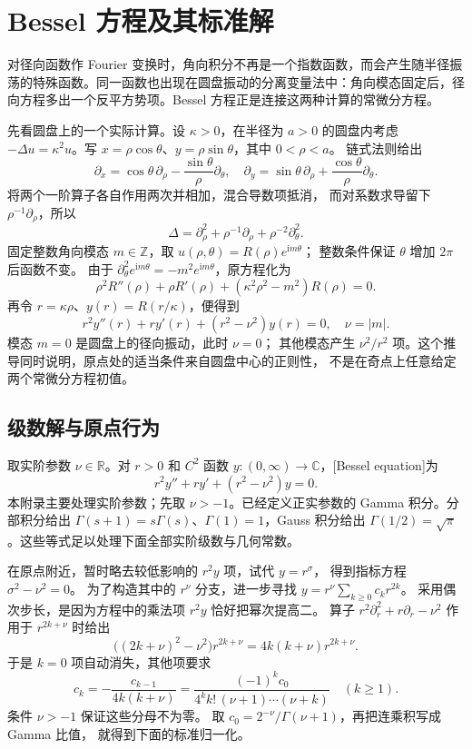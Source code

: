 \section{Bessel 方程及其标准解}
\label{b2:sec:A201}

对径向函数作 Fourier 变换时，角向积分不再是一个指数函数，而会产生随半径振荡的特殊函数。同一函数也出现在圆盘振动的分离变量法中：角向模态固定后，径向方程多出一个反平方势项。Bessel 方程正是连接这两种计算的常微分方程。

\ProseParagraphBreak
先看圆盘上的一个实际计算。设 \(\kappa>0\)，在半径为 \(a>0\) 的圆盘内考虑
\(-\Delta u=\kappa^2u\)。写
\(x=\rho\cos\theta\)、\(y=\rho\sin\theta\)，其中 \(0<\rho<a\)。
链式法则给出
\[
 \partial_x=\cos\theta\,\partial_\rho
 -\frac{\sin\theta}{\rho}\partial_\theta,\quad
 \partial_y=\sin\theta\,\partial_\rho
 +\frac{\cos\theta}{\rho}\partial_\theta.
\]
将两个一阶算子各自作用两次并相加，混合导数项抵消，
而对系数求导留下 \(\rho^{-1}\partial_\rho\)，所以
\[
 \Delta=\partial_\rho^2+\rho^{-1}\partial_\rho
 +\rho^{-2}\partial_\theta^2.
\]
固定整数角向模态 \(m\in\mathbb Z\)，取
\(u(\rho,\theta)=R(\rho)e^{\mathrm im\theta}\)；
整数条件保证 \(\theta\) 增加 \(2\pi\) 后函数不变。
由于 \(\partial_\theta^2e^{\mathrm im\theta}=-m^2e^{\mathrm im\theta}\)，原方程化为
\begin{equation}\label{b2:eq:A2-disk-radial}
 \rho^2R''(\rho)+\rho R'(\rho)
 +(\kappa^2\rho^2-m^2)R(\rho)=0.
\end{equation}
再令 \(r=\kappa\rho\)、\(y(r)=R(r/\kappa)\)，便得到
\[
 r^2y''(r)+ry'(r)+(r^2-\nu^2)y(r)=0,
 \quad \nu=|m|.
\]
模态 \(m=0\) 是圆盘上的径向振动，此时 \(\nu=0\)；
其他模态产生 \(\nu^2/r^2\) 项。这个推导同时说明，原点处的适当条件来自圆盘中心的正则性，
不是在奇点上任意给定两个常微分方程初值。

\subsection{级数解与原点行为}
\label{b2:subsec:A20101}

取实阶参数 \(\nu\in\mathbb R\)。对 \(r>0\) 和 \(C^2\) 函数 \(y:(0,\infty)\to\mathbb C\)，[Bessel equation]为
\[r^2y''+ry'+(r^2-\nu^2)y=0.\]
本附录主要处理实阶参数；先取 \(\nu>-1\)。已经定义正实参数的 Gamma 积分。分部积分给出 \(\Gamma(s+1)=s\Gamma(s)\)、\(\Gamma(1)=1\)，Gauss 积分给出 \(\Gamma(1/2)=\sqrt\pi\)。这些等式足以处理下面全部实阶级数与几何常数。

\ProseParagraphBreak
在原点附近，暂时略去较低影响的 \(r^2y\) 项，试代 \(y=r^\sigma\)，
得到指标方程 \(\sigma^2-\nu^2=0\)。
为了构造其中的 \(r^\nu\) 分支，进一步寻找
\(y=r^\nu\sum_{k\geq0}c_kr^{2k}\)。
采用偶次步长，是因为方程中的乘法项 \(r^2y\) 恰好把幂次提高二。
算子 \(r^2\partial_r^2+r\partial_r-\nu^2\) 作用于
\(r^{2k+\nu}\) 时给出
\[
 \bigl((2k+\nu)^2-\nu^2\bigr)r^{2k+\nu}
 =4k(k+\nu)r^{2k+\nu}.
\]
于是 \(k=0\) 项自动消失，其他项要求
\[
 c_k=-\frac{c_{k-1}}{4k(k+\nu)}
 =\frac{(-1)^kc_0}
 {4^kk!\,(\nu+1)\cdots(\nu+k)}\quad(k\geq1).
\]
条件 \(\nu>-1\) 保证这些分母不为零。
取 \(c_0=2^{-\nu}/\Gamma(\nu+1)\)，再把连乘积写成 Gamma 比值，
就得到下面的标准归一化。

